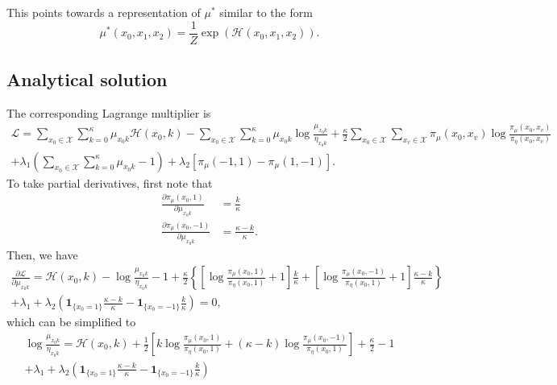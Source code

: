\documentclass[12pt]{article}
\begin{document}
This points towards a representation of $\mu^*$ similar to the form
\begin{equation*}
    \mu^*(x_0, x_1, x_2) = \frac1Z\exp(\mathcal{H}(x_0, x_1, x_2)).
\end{equation*}

\newpage

\subsection{Analytical solution}

The corresponding Lagrange multiplier is
\begin{multline*}
    \mathcal{L} = \sum_{x_0\in\mathcal{X}}\sum_{k=0}^\kappa \mu_{x_0k}\mathcal{H}(x_0, k)
    - \sum_{x_0\in\mathcal{X}}\sum_{k=0}^\kappa \mu_{x_0k}\log\frac{\mu_{x_0k}}{\eta_{x_0k}}
    + \frac{\kappa}{2} \sum_{x_0\in\mathcal{X}}\sum_{x_v\in\mathcal{X}} \pi_\mu(x_0, x_v)\log\frac{\pi_\mu(x_0, x_v)}{\pi_\eta(x_0, x_v)} \\
    + \lambda_1 \left(\sum_{x_0\in\mathcal{X}}\sum_{k=0}^\kappa \mu_{x_0k} - 1\right)
    + \lambda_2 \left[\pi_\mu(-1, 1) - \pi_\mu(1, -1)\right].
\end{multline*}
To take partial derivatives, first note that
\begin{align*}
    \frac{\partial \pi_\mu(x_0, 1)}{\partial \mu_{x_0k}}  & = \frac{k}{\kappa}           \\
    \frac{\partial \pi_\mu(x_0, -1)}{\partial \mu_{x_0k}} & = \frac{\kappa - k}{\kappa}.
\end{align*}
Then, we have
\begin{multline*}
    \frac{\partial \mathcal{L}}{\partial \mu_{x_0k}} = \mathcal{H}(x_0, k)
    - \log\frac{\mu_{x_0k}}{\eta_{x_0k}} - 1
    + \frac{\kappa}{2}\left\{
    \left[\log\frac{\pi_\mu(x_0, 1)}{\pi_\eta(x_0, 1)}+1\right]\frac{k}{\kappa} +
    \left[\log\frac{\pi_\mu(x_0, -1)}{\pi_\eta(x_0, 1)}+1\right]\frac{\kappa - k}{\kappa}
    \right\} \\
    + \lambda_1
    + \lambda_2 \left(\mathbf{1}_{\{x_0=1\}}\frac{\kappa - k}{\kappa} -
    \mathbf{1}_{\{x_0=-1\}}\frac{k}{\kappa}\right) = 0,
\end{multline*}
which can be simplified to
\begin{multline*}
    \log\frac{\mu_{x_0k}}{\eta_{x_0k}} = \mathcal{H}(x_0, k)
    + \frac{1}{2}\left[
        k\log\frac{\pi_\mu(x_0, 1)}{\pi_\eta(x_0, 1)} +
        (\kappa - k)\log\frac{\pi_\mu(x_0, -1)}{\pi_\eta(x_0, 1)}
        \right] + \frac{\kappa}{2} - 1\\
    + \lambda_1
    + \lambda_2 \left(\mathbf{1}_{\{x_0=1\}}\frac{\kappa - k}{\kappa} -
    \mathbf{1}_{\{x_0=-1\}}\frac{k}{\kappa}\right)
\end{multline*}
\end{document}
